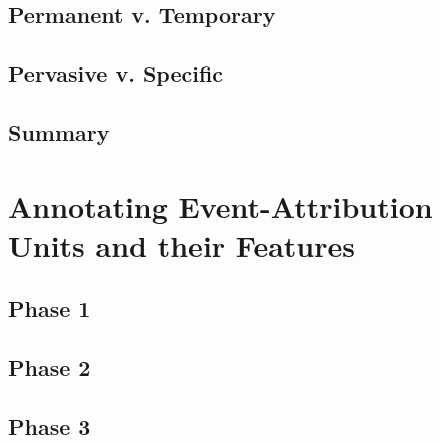 \documentclass[a4paper,12pt]{article}
\begin{document}
\subsection{Permanent v. Temporary}
\subsection{Pervasive v. Specific}
\subsection{Summary}

\section{Annotating Event-Attribution Units and their Features}
\subsection{Phase 1}
\subsection{Phase 2}
\subsection{Phase 3}
\end{document}
